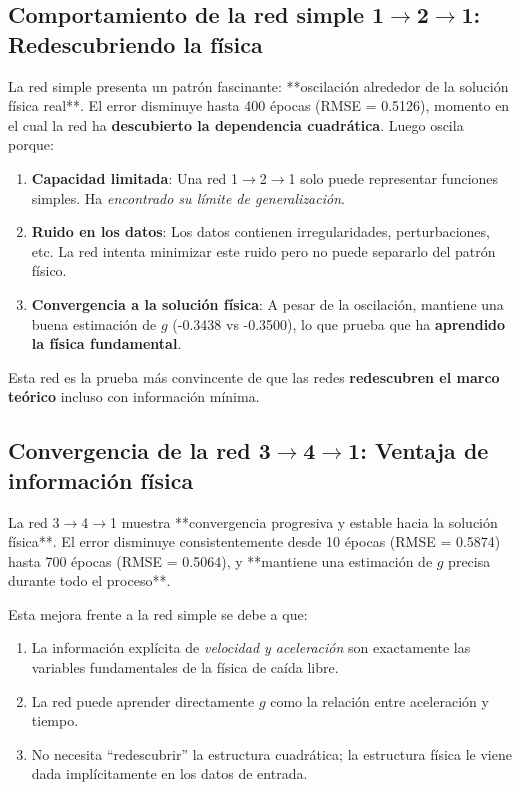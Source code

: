 \documentclass[11pt]{article}
\begin{document}
	\subsection{Comportamiento de la red simple 1$\rightarrow$2$\rightarrow$1: Redescubriendo la física}
	La red simple presenta un patrón fascinante: **oscilación alrededor de la solución física real**. El error disminuye hasta 400 épocas (RMSE = 0.5126), momento en el cual la red ha \textbf{descubierto la dependencia cuadrática}. Luego oscila porque:
	
	\begin{enumerate}
		\item \textbf{Capacidad limitada}: Una red 1$\rightarrow$2$\rightarrow$1 solo puede representar funciones simples. Ha \textit{encontrado su límite de generalización}.
		\item \textbf{Ruido en los datos}: Los datos contienen irregularidades, perturbaciones, etc. La red intenta minimizar este ruido pero no puede separarlo del patrón físico.
		\item \textbf{Convergencia a la solución física}: A pesar de la oscilación, mantiene una buena estimación de $g$ (-0.3438 vs -0.3500), lo que prueba que ha \textbf{aprendido la física fundamental}.
	\end{enumerate}
	
	Esta red es la prueba más convincente de que las redes \textbf{redescubren el marco teórico} incluso con información mínima.
	
	\subsection{Convergencia de la red 3$\rightarrow$4$\rightarrow$1: Ventaja de información física}
	La red 3$\rightarrow$4$\rightarrow$1 muestra **convergencia progresiva y estable hacia la solución física**. El error disminuye consistentemente desde 10 épocas (RMSE = 0.5874) hasta 700 épocas (RMSE = 0.5064), y **mantiene una estimación de $g$ precisa durante todo el proceso**.
	
	Esta mejora frente a la red simple se debe a que:
	\begin{enumerate}
		\item La información explícita de \textit{velocidad y aceleración} son exactamente las variables fundamentales de la física de caída libre.
		\item La red puede aprender directamente $g$ como la relación entre aceleración y tiempo.
		\item No necesita \enquote{redescubrir} la estructura cuadrática; la estructura física le viene dada implícitamente en los datos de entrada.
	\end{enumerate}
	
\end{document}
